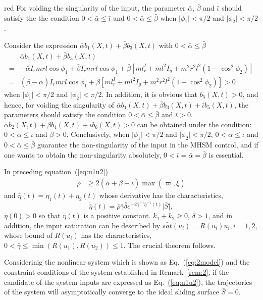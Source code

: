 \begin{color}{red}
For voiding the singularity of the input, the parameter $\bar\alpha$, $\bar\beta$ and $\bar\iota$ should satisfy the the condition $0<\bar\alpha\le\bar\iota$ and $0<\bar\alpha\le\bar\beta$ when $\vert\phi_1\vert<\pi/2$ and $\vert\phi_2\vert<\pi/2$.\par
    Consider the expression $\bar\alpha b_1(X,t) + \bar\beta b_3(X,t)$ with $0<\bar\alpha\le \bar\beta$
    \begin{align*}
    &\bar\alpha b_1(X,t) + \bar\beta b_3(X,t)\\
    =&-\bar\alpha I_rmrl\cos\phi_1 + \bar\beta I_rmrl\cos\phi_1+\bar\beta[ml^I_r+ml^2I_g+m^2r^2l^2(1-\cos^2\phi_2)]\\
    =&(\bar\beta-\bar\alpha) I_rmrl\cos\phi_1+\bar\beta[ml^I_r+ml^2I_g+m^2r^2l^2(1-\cos^2\phi_2)]>0
    \end{align*}
    when $\vert\phi_1\vert<\pi/2$ and $\vert\phi_2\vert<\pi/2$.
    In addition, it is obvious that $b_5(X,t)>0$, and hence, for voiding the singularity of $\bar\alpha b_1(X,t) + \bar\beta b_3(X,t) + \bar\iota b_5(X,t)$,  the parameters should satisfy the condition $0<\bar\alpha\le\bar\beta$ and $\bar\iota>0$. $\bar\alpha b_2(X,t) + \bar\beta b_4(X,t) + \bar\iota b_6(X,t)>0$ can be obtained under the condition: $0<\bar\alpha\le\bar\iota$ and $\bar\beta>0$. Conclusively, when $\vert\phi_1\vert<\pi/2$ and $\vert\phi_2\vert<\pi/2$, $0<\bar\alpha\le\bar\iota$ and $0<\bar\alpha\le\bar\beta$ guarantee the non-singularity of the input in the MHSM control, and if one wants to obtain the non-singularity absolutely, $0<\bar\iota=\bar\alpha=\bar\beta$ is essential.
\end{color}
In preceding equation~(\ref{eq:u1u2})
\begin{align}
\bar\rho &\ge 2(\bar\alpha + \bar\beta + \bar\iota)\max(\bar\varpi,\bar\xi)
\end{align}
and $\bar\eta(t)=\eta_1(t)+\eta_2(t)$ whose derivative has the characteristics, $$\dot{{\bar\eta}}(t) = \bar\rho\bar\gamma\bar\delta e^{-2\bar\gamma^{-1}{\bar\eta}^{-1}(t)}\vert \bar S\vert,$$ $\bar\eta(0) > 0$ so that $\bar\eta(t)$ is a positive constant. $k_1+k_2\ge 0$, $\bar\delta >1$, and in addition, the input saturation can be described by $\bar{sat}(u_i) = R(u_i)u_i, i =1,2$, whose bound of $R(u_i)$ has the characteristics, $0<\bar\gamma\le \min(R(u_1),R(u_2))\le 1$. The crucial theorem follows.
\begin{theorem}
Considerinig the nonlinear system which is shown as Eq.~(\ref{eq:2model}) and the constraint conditions of the system established in Remark~\ref{rem:2}, if the candidate of the system inputs are expressed as Eq.~(\ref{eq:u1u2}), the trajectories of the system will asymptotically converge to the ideal sliding surface $\bar S=0$.\label{theorem:3}
\end{theorem}
